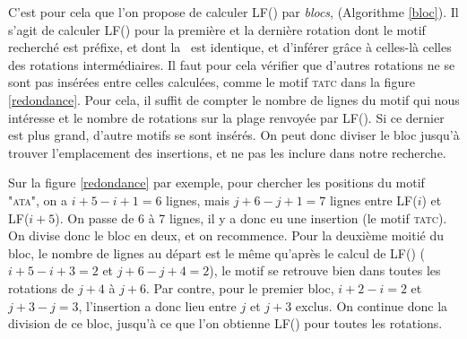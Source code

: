 C'est pour cela que l'on propose de calculer LF() par \textit{blocs}, (Algorithme \ref{bloc}). Il s'agit de calculer LF() pour la première et la dernière rotation dont le motif recherché est préfixe, et dont la \kbwt\ est identique, et d'inférer grâce à celles-là celles des rotations intermédiaires. Il faut pour cela vérifier que d'autres rotations ne se sont pas insérées entre celles calculées, comme le motif \textsc{tatc} dans la figure \ref{redondance}. Pour cela, il suffit de compter le nombre de lignes du motif qui nous intéresse et le nombre de rotations sur la plage renvoyée par LF(). Si ce dernier est plus grand, d'autre motifs se sont insérés. On peut donc diviser le bloc jusqu'à trouver l'emplacement des insertions, et ne pas les inclure dans notre recherche.

Sur la figure \ref{redondance} par exemple, pour chercher les positions du motif \textsc{"ata"}, on a $i+5 - i +1 = 6$ lignes, mais $j+6 - j +1 = 7$ lignes entre LF($i$) et LF($i+5$). On passe de 6 à 7 lignes, il y a donc eu une insertion (le motif \textsc{tatc}). On divise donc le bloc en deux, et on recommence. Pour la deuxième moitié du bloc, le nombre de lignes au départ est le même qu'après le calcul de LF() ($i+5 - i+3 = 2$ et $j+6 - j+4 = 2$), le motif se retrouve bien dans toutes les rotations de $j+4$ à $j+6$. Par contre, pour le premier bloc, $i+2 - i = 2$ et $j+3 - j = 3$, l'insertion a donc lieu entre $j$ et $j+3$ exclus. On continue donc la division de ce bloc, jusqu'à ce que l'on obtienne LF() pour toutes les rotations.


